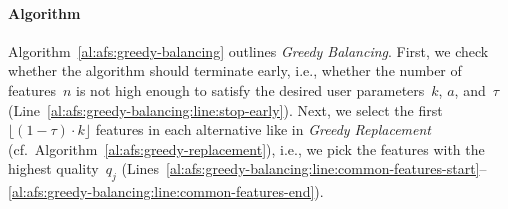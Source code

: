 \documentclass{article}
\theoremstyle{definition}
\begin{document}
\paragraph{Algorithm}

Algorithm~\ref{al:afs:greedy-balancing} outlines \emph{Greedy Balancing}.
First, we check whether the algorithm should terminate early, i.e., whether the number of features~$n$ is not high enough to satisfy the desired user parameters~$k$, $a$, and~$\tau$ (Line~\ref{al:afs:greedy-balancing:line:stop-early}).
Next, we select the first $\lfloor (1 - \tau) \cdot k \rfloor$ features in each alternative like in \emph{Greedy Replacement} (cf.~Algorithm~\ref{al:afs:greedy-replacement}), i.e., we pick the features with the highest quality~$q_j$ (Lines~\ref{al:afs:greedy-balancing:line:common-features-start}--\ref{al:afs:greedy-balancing:line:common-features-end}).
\end{document}
